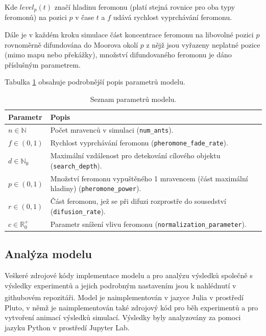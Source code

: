 \documentclass[10pt,a4paper,twocolumn]{article}
\begin{document}
Kde $level_{p}(t)$ značí hladinu feromonu (platí stejná rovnice pro oba typy feromonů) 
na pozici $p$ v čase $t$ a $f$ udává rychlost vyprchávání feromonu.

Dále je v každém kroku simulace část koncentrace feromonu na libovolné pozici $p$ 
rovnoměrně difundována do Moorova okolí $p$ z nějž jsou vyřazeny neplatné pozice
(mimo mapu nebo překážky), množství difundovaného feromonu je dáno 
příslušným parametrem.

Tabulka \ref{table:parametry} obsahuje podrobnější popis parametrů modelu.


\begin{table}[t]
  \centering %
  \begin{tabular}{l p{5cm}}
  \toprule
  Parametr & Popis \\
  \midrule
    $n \in \mathbb{N}$ & Počet mravenců v simulaci 
    (\texttt{num\_ants}). \\ 
    $f \in (0, 1)$ & Rychlost vyprchávání feromonu 
    (\texttt{pheromone\_fade\_rate}). \\
    $d \in \mathbb{N}_0$ & Maximální vzdálenost pro detekování 
    cílového objektu (\texttt{search\_depth}).\\
    $p \in (0, 1)$ & Množství feromonu vypuštěného 1 mravencem 
    (část maximální hladiny) (\texttt{pheromone\_power}).\\
    $r \in (0, 1)$ & Část feromonu, jež se při difuzi rozprostře do 
    sousedství (\texttt{difusion\_rate}). \\
    $c \in \mathbb{R}_0^{+}$ & Parametr snížení vlivu feromonu
    (\texttt{normalization\_parameter}).\\ 
  \bottomrule
  \end{tabular}
  \caption{Seznam parametrů modelu.} \label{table:parametry} 
\end{table}



\subsection{Analýza modelu}

Veškeré zdrojové kódy implementace modelu a pro analýzu výsledků společně s
výsledky experimentů a jejich podrobným nastavením jsou k nahlédnutí v 
githubovém repozitáři\textsuperscript{\cite{Beinhauer_Ant_Colony_Model_2023}}.
Model je 
naimplementován v jazyce Julia v prostředí Pluto, v němž je naimplementován
také zdrojový kód pro běh experimentů a pro vytvoření animací výsledků
simulací. Výsledky byly analyzovány za pomoci jazyku Python v prostředí 
Jupyter Lab.
\end{document}
